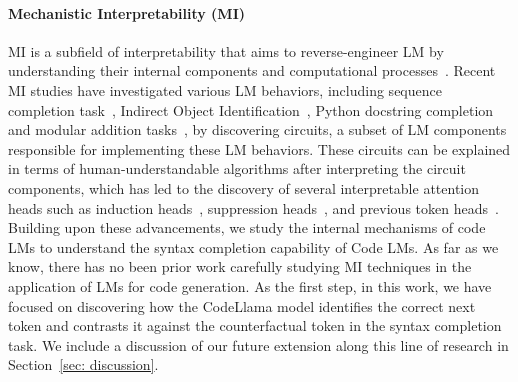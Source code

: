 {\paragraph{Mechanistic Interpretability (MI)} MI is a subfield of interpretability that aims to reverse-engineer LM by understanding their internal components and computational processes~\cite{elhage2021mathematical, olah2020zoom, rai2024practical, bereska2024mechanistic}. Recent MI studies have investigated various LM behaviors, including sequence completion task~\cite{elhage2021mathematical}, Indirect Object Identification~\cite{wang2022interpretabilitywildcircuitindirect}, Python docstring completion~\cite{heimersheim2023circuit, conmy2023towards} and modular addition tasks~\cite{nanda2023progress}, by discovering circuits, a subset of LM components responsible for implementing these LM behaviors. These circuits can be explained in terms of human-understandable algorithms after interpreting the circuit components, which has led to the discovery of several interpretable attention heads such as induction heads~\cite{elhage2021mathematical}, suppression heads~\cite{mcdougall2023copy}, and previous token heads~\cite{elhage2021mathematical}. Building upon these advancements, we study the internal mechanisms of code LMs to understand the syntax completion capability of Code LMs. As far as we know, there has no been prior work carefully studying MI techniques in the application of LMs for code generation. As the first step, in this work, we have focused on discovering how the CodeLlama model identifies the correct next token and contrasts it against the counterfactual token in the syntax completion task. We include a discussion of our future extension along this line of research in Section~\ref{sec: discussion}.}
